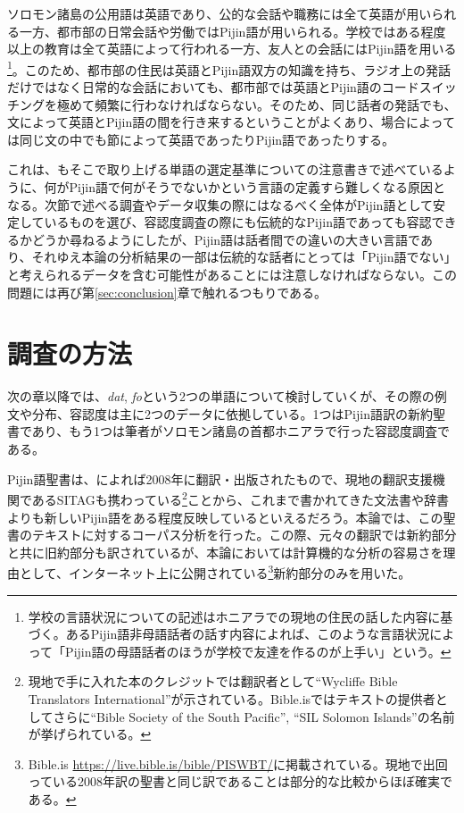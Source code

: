 ソロモン諸島の公用語は英語であり、公的な会話や職務には全て英語が用いられる一方、都市部の日常会話や労働ではPijin語が用いられる。学校ではある程度以上の教育は全て英語によって行われる一方、友人との会話にはPijin語を用いる\footnote{
学校の言語状況についての記述はホニアラでの現地の住民の話した内容に基づく。あるPijin語非母語話者の話す内容によれば、このような言語状況によって「Pijin語の母語話者のほうが学校で友達を作るのが上手い」という。
}。このため、都市部の住民は英語とPijin語双方の知識を持ち、ラジオ上の発話だけではなく日常的な会話においても、都市部では英語とPijin語のコードスイッチングを極めて頻繁に行わなければならない。そのため、同じ話者の発話でも、文によって英語とPijin語の間を行き来するということがよくあり、場合によっては同じ文の中でも節によって英語であったりPijin語であったりする。

これは、\cite{dictionary}もそこで取り上げる単語の選定基準についての注意書きで述べているように、何がPijin語で何がそうでないかという言語の定義すら難しくなる原因となる。次節で述べる調査やデータ収集の際にはなるべく全体がPijin語として安定しているものを選び、容認度調査の際にも伝統的なPijin語であっても容認できるかどうか尋ねるようにしたが、Pijin語は話者間での違いの大きい言語であり、それゆえ本論の分析結果の一部は伝統的な話者にとっては「Pijin語でない」と考えられるデータを含む可能性があることには注意しなければならない。この問題には再び第\ref{sec:conclusion}章で触れるつもりである。

\section{調査の方法}\label{sec:howexamined}
次の章以降では、\textit{dat}, \textit{fo}という2つの単語について検討していくが、その際の例文や分布、容認度は主に2つのデータに依拠している。1つはPijin語訳の新約聖書であり、もう1つは筆者がソロモン諸島の首都ホニアラで行った容認度調査である。

Pijin語聖書は、\cite{solomontimes}によれば2008年に翻訳・出版されたもので、現地の翻訳支援機関であるSITAGも携わっている\footnote{
現地で手に入れた本のクレジットでは翻訳者として``Wycliffe Bible Translators International''が示されている。Bible.isではテキストの提供者としてさらに``Bible Society of the South Pacific'', ``SIL Solomon Islands''の名前が挙げられている。}ことから、これまで書かれてきた文法書や辞書よりも新しいPijin語をある程度反映しているといえるだろう。本論では、この聖書のテキストに対するコーパス分析を行った。この際、元々の翻訳では新約部分と共に旧約部分も訳されているが、本論においては計算機的な分析の容易さを理由として、インターネット上に公開されている\footnote{
Bible.is \url{https://live.bible.is/bible/PISWBT/}に掲載されている。現地で出回っている2008年訳の聖書と同じ訳であることは部分的な比較からほぼ確実である。}新約部分のみを用いた。

